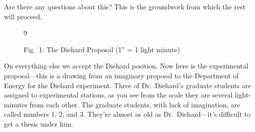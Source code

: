 \documentclass[twocolumn,prb]{revtex4}
\begin{document}
Are there any questions about this? This is the groundwork from which the rest will proceed.
\begin{figure}[htb] 
\begin{mdframed}
  \vspace{5pt}\hfill 9\\[-11pt]
  \begin{center}
  \end{center}
  \begin{center}
    {Fig.~1: The Diehard Proposal (1'' = 1 light minute)}
  \end{center}
  \vspace{6pt}
\end{mdframed}
\end{figure}

On everything else we accept the Diehard position. Now here is the experimental proposal---this is a drawing from an imaginary proposal to the Department of Energy for the Diehard experiment. Three of Dr.\ Diehard's graduate students are assigned to experimental stations, as you see from the scale they are several light-minutes from each other. The graduate students, with lack of imagination, are called numbers 1, 2, and 3. They're almost as old as Dr.\ Diehard---it's difficult to get a thesis under him.
\end{document}
